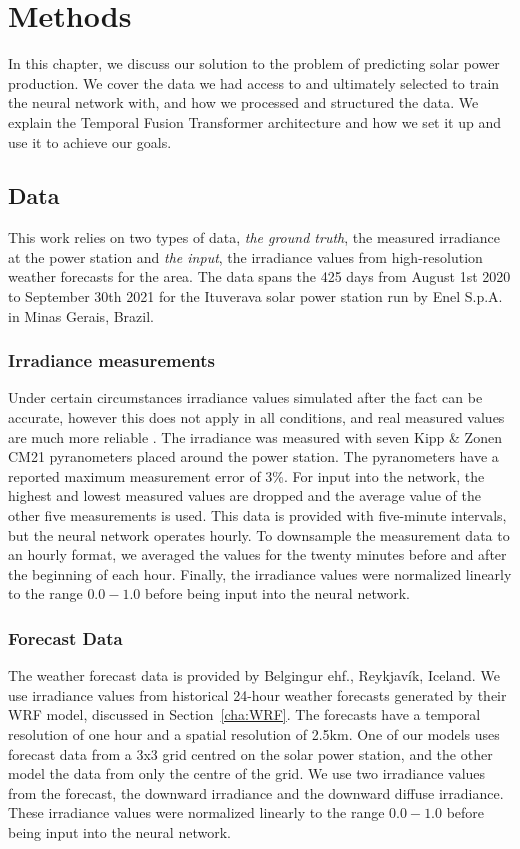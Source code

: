 \chapter{Methods}

In this chapter, we discuss our solution to the problem of predicting solar power production. We cover the data we had access to and ultimately selected to train the neural network with, and how we processed and structured the data. We explain the Temporal Fusion Transformer architecture and how we set it up and use it to achieve our goals.

\section{Data}
This work relies on two types of data, \emph{the ground truth}, the measured irradiance at the power station and \emph{the input}, the irradiance values from high-resolution weather forecasts for the area. The data spans the 425 days from August 1st 2020 to September 30th 2021 for the Ituverava solar power station run by Enel S.p.A. in Minas Gerais, Brazil.

\subsection{Irradiance measurements}
Under certain circumstances irradiance values simulated after the fact can be accurate, however this does not apply in all conditions, and real measured values are much more reliable \cite{gueymard_global_2008}. The irradiance was measured with seven Kipp \& Zonen CM21 pyranometers placed around the power station. The pyranometers have a reported maximum measurement error of 3\%. For input into the network, the highest and lowest measured values are dropped and the average value of the other five measurements is used. This data is provided with five-minute intervals, but the neural network operates hourly. To downsample the measurement data to an hourly format, we averaged the values for the twenty minutes before and after the beginning of each hour. Finally, the irradiance values were normalized linearly to the range $0.0-1.0$ before being input into the neural network.


\subsection{Forecast Data\label{cha:forecast_data}}
The weather forecast data is provided by Belgingur ehf., Reykjavík, Iceland. We use irradiance values from historical 24-hour weather forecasts generated by their WRF model, discussed in Section~\ref{cha:WRF}. The forecasts have a temporal resolution of one hour and a spatial resolution of 2.5km. One of our models uses forecast data from a 3x3 grid centred on the solar power station, and the other model the data from only the centre of the grid. We use two irradiance values from the forecast, the downward irradiance and the downward diffuse irradiance. These irradiance values were normalized linearly to the range $0.0-1.0$ before being input into the neural network.


